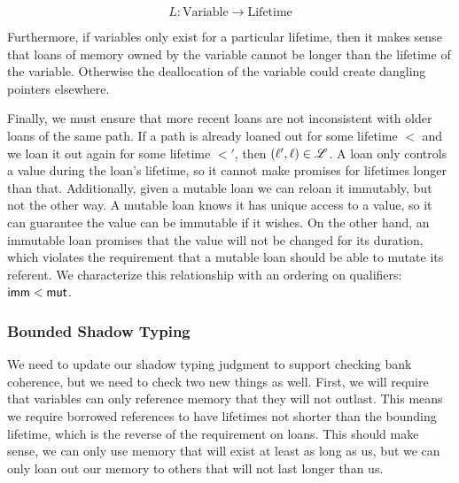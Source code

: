 $$ L : \textrm{Variable} \rightarrow \textrm{Lifetime} $$

Furthermore, if variables only exist for a particular lifetime, then it makes sense that
loans of memory owned by the variable cannot be longer than the lifetime of the variable.
Otherwise the deallocation of the variable could create dangling pointers elsewhere.

Finally, we must ensure that more recent loans are not inconsistent with older loans
of the same path. If a path is already loaned out for some lifetime $\lt$ and
we loan it out again for some lifetime $\lt'$, then $(\ell', \ell) \in \mathscr{L}$.
A loan only controls a value during the loan's lifetime, so it cannot make promises
for lifetimes longer than that. Additionally, given a mutable loan we can reloan it immutably,
but not the other way. A mutable loan knows it has unique access to a value, so it can
guarantee the value can be immutable if it wishes. On the other hand, an immutable loan
promises that the value will not be changed for its duration, which violates the requirement
that a mutable loan should be able to mutate its referent. We characterize this relationship
with an ordering on qualifiers: $\mathsf{imm} < \mathsf{mut}$.
\newline

\fbox{$\bankwf{\ltr}{\$}{\lt}$}


\subsubsection*{Bounded Shadow Typing}
We need to update our shadow typing judgment to support checking bank coherence,
but we need to check two new things as well. First, we will require that
variables can only reference memory that they will not outlast. This means
we require borrowed references to have lifetimes not shorter than the bounding lifetime,
which is the reverse of the requirement on loans. This should make sense, we can only use
memory that will exist at least as long as us, but we can only loan out our memory
to others that will not last longer than us.

